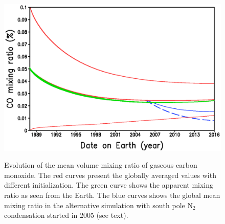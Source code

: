 \begin{figure}
  \begin{center}
   \includegraphics[width=12.cm,angle=-0,clip]{figures/evol_co.eps} \\
    \caption{
Evolution of the mean volume mixing ratio of gaseous carbon monoxide. The red curves
present the globally averaged values with different initialization. 
The green curve shows the apparent mixing ratio as seen from the Earth. The blue
curves shows the global mean mixing ratio in the alternative simulation 
with south pole N$_2$ condensation started in 2005 (see text). 
\label{fg:evol_co}
}
  \end{center}
\end{figure}



